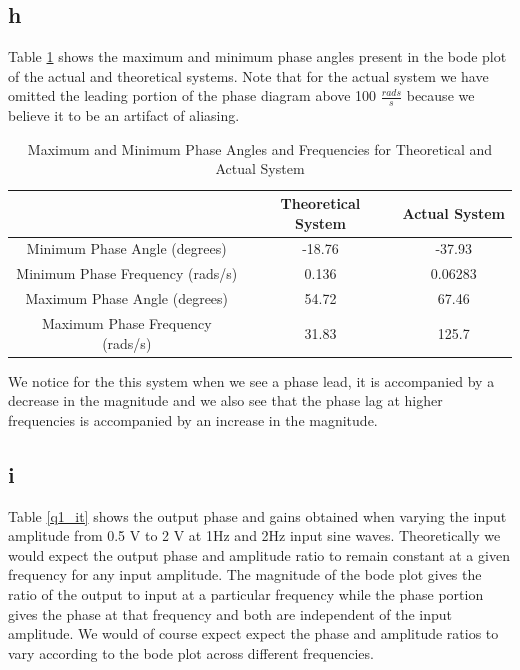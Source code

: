 \documentclass{article}
\theoremstyle{plain}
\theoremstyle{definition}
\theoremstyle{remark}
\begin{document}
\subsection*{h}
Table \ref{q1_th} shows the maximum and minimum phase angles present in the bode plot of the actual and theoretical systems.  Note that for the actual system we have omitted the leading portion of the phase diagram above 100 $\frac{rads}{s}$ because we believe it to be an artifact of aliasing.  
\begin{table}[hbt]
\begin{center}
	\begin{tabular}{|c|c|c|}
		\hline
		 & \textbf{Theoretical System} & \textbf{Actual System}  \\ \hline
		Minimum Phase Angle (degrees) & -18.76 &  -37.93\\
		Minimum Phase Frequency (rads/s) & 0.136 & 0.06283\\
		Maximum Phase Angle (degrees) & 54.72 & 67.46 \\ 
		Maximum Phase Frequency (rads/s) & 31.83 & 125.7\\ \hline
	\end{tabular}
\caption{Maximum and Minimum Phase Angles and Frequencies for Theoretical and Actual System}
\label{q1_th}
\end{center}
\end{table}

We notice for the this system when we see a phase lead, it is accompanied by a decrease in the magnitude and we also see that the phase lag at higher frequencies is accompanied by an increase in the magnitude. 

\subsection*{i}

Table \ref{q1_it} shows the output phase and gains obtained when varying the input amplitude from 0.5 V to 2 V at 1Hz and 2Hz input sine waves.  Theoretically we would expect the output phase and amplitude ratio to remain constant at a given frequency for any input amplitude.  The magnitude of the bode plot gives the ratio of the output to input at a particular frequency while the phase portion gives the phase at that frequency and both are independent of the input amplitude. We would of course expect expect the phase and amplitude ratios to vary according to the bode plot across different frequencies.  \\
\end{document}
